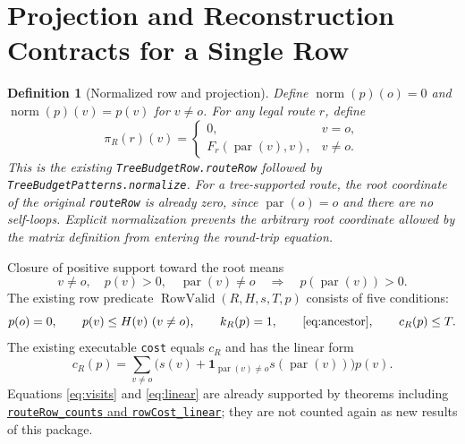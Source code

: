 \documentclass[11pt]{article}
\newtheorem{definition}[proposition]{Definition}
\theoremstyle{remark}
\newcommand{\pa}{\operatorname{par}}
\newcommand{\norm}{\operatorname{norm}}
\newcommand{\RV}{\operatorname{RowValid}}
\newcommand{\code}[1]{\nolinkurl{#1}}
\newcommand{\src}[2]{\href{https://github.com/huam54925-cpu/uav-routing-certification/blob/1bc992475a9bd515d77245e2bc0471e5ecab2fd5/LeanCompletion/UAV/#1.lean}{#2}}
\begin{document}
\section{Projection and Reconstruction Contracts for a Single Row}

\begin{definition}[Normalized row and projection]
Define $\norm(p)(o)=0$ and $\norm(p)(v)=p(v)$ for $v\neq o$.
For any legal route $r$, define
\[
 \pi_R(r)(v)=
 \begin{cases}0,&v=o,\\F_r(\pa(v),v),&v\neq o.\end{cases}
\]
This is the existing \code{TreeBudgetRow.routeRow} followed by
\code{TreeBudgetPatterns.normalize}.
For a tree-supported route, the root coordinate of the original \code{routeRow} is already zero, since $\pa(o)=o$ and there are no self-loops.
Explicit normalization prevents the arbitrary root coordinate allowed by the matrix definition from entering the round-trip equation.
\end{definition}

Closure of positive support toward the root means
\begin{equation}\label{eq:ancestor}
 v\neq o,\quad p(v)>0,\quad\pa(v)\neq o
 \quad\Longrightarrow\quad p(\pa(v))>0.
\end{equation}
The existing row predicate $\RV(R,H,s,T,p)$ consists of five conditions:
\begin{equation}\label{eq:rowvalid}
 p(o)=0,\qquad p(v)\leq H(v)\ (v\neq o),\qquad
 k_R(p)=1,\qquad\eqref{eq:ancestor},\qquad c_R(p)\leq T.
\end{equation}
The existing executable \code{cost} equals $c_R$ and has the linear form
\begin{equation}\label{eq:linear}
 c_R(p)=\sum_{v\neq o}
 \bigl(s(v)+\boldsymbol 1_{\pa(v)\neq o}s(\pa(v))\bigr)p(v).
\end{equation}
Equations \eqref{eq:visits} and \eqref{eq:linear} are already supported by theorems including
\src{TreeBudgetRow}{\code{routeRow_counts} and \code{rowCost_linear}};
they are not counted again as new results of this package.
\end{document}
